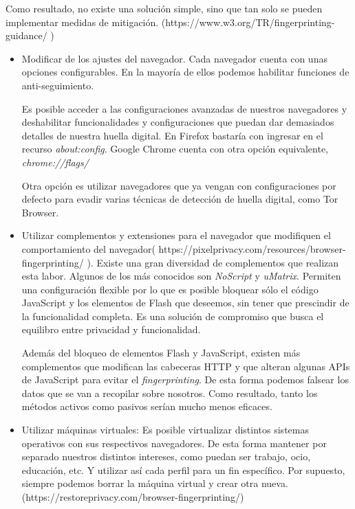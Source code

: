 Como resultado, no existe una solución simple, sino que tan solo se pueden implementar medidas de mitigación. (https://www.w3.org/TR/fingerprinting-guidance/
) \par 

\begin{itemize}
	\item Modificar de los ajustes del navegador. Cada navegador cuenta con unas opciones configurables. En la mayoría de ellos podemos habilitar funciones de anti-seguimiento. \par
	
	Es posible acceder a las configuraciones avanzadas de nuestros navegadores y deshabilitar funcionalidades y configuraciones que puedan dar demasiados detalles de nuestra huella digital. En Firefox bastaría con ingresar en el recurso \textit{about:config}. Google Chrome cuenta con otra opción equivalente, \textit{chrome://flags/} \par
	
	Otra opción es utilizar navegadores que ya vengan con configuraciones por defecto para evadir varias técnicas de detección de huella digital, como Tor Browser.
	
	\item Utilizar complementos y extensiones para el navegador que modifiquen el comportamiento del navegador( https://pixelprivacy.com/resources/browser-fingerprinting/ ). Existe una gran diversidad de complementos que realizan esta labor. Algunos de los más conocidos son \textit{NoScript} y \textit{uMatrix}.
	Permiten una configuración flexible por lo que es posible bloquear sólo el código JavaScript y los elementos de Flash que deseemos, sin tener que prescindir de la funcionalidad completa. Es una solución de compromiso que busca el equilibro entre privacidad y funcionalidad. \par
	
	Además del bloqueo de elementos Flash y JavaScript, existen más complementos que modifican las cabeceras HTTP y que alteran algunas APIs de JavaScript para evitar el \textit{fingerprinting}. De esta forma podemos falsear los datos que se van a recopilar sobre nosotros. Como resultado, tanto los métodos activos como pasivos serían mucho menos eficaces.
	
	
	\item Utilizar máquinas virtuales: Es posible virtualizar distintos sistemas operativos con sus respectivos navegadores. De esta forma mantener por separado nuestros distintos intereses, como puedan ser trabajo, ocio, educación, etc. Y utilizar así cada perfil para un fin específico. Por supuesto, siempre podemos borrar la máquina virtual y crear otra nueva. (https://restoreprivacy.com/browser-fingerprinting/)
	
\end{itemize}

